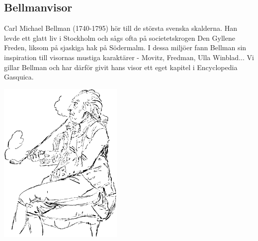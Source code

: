 \begin{flushleft}
\section{Bellmanvisor}
{\Large Carl Michael Bellman (1740-1795) hör till de största svenska skalderna.
Han levde ett glatt liv i Stockholm och sågs ofta på societetskrogen Den Gyllene Freden, liksom på sjaskiga hak på Södermalm.
I dessa miljöer fann Bellman sin inspiration till visornas mustiga karaktärer - Movitz, Fredman, Ulla Winblad...
Vi gillar Bellman och har därför givit hans visor ett eget kapitel i Encyclopedia Gasquica.}
\end{flushleft}

\vspace{2cm}
\begin{center}
\includegraphics[width=6cm]{bilder/bellman.png}
\end{center}
\newpage

\newpage
{} %
\newpage
\renewcommand{\baselinestretch}{.98}
\renewcommand{\baselinestretch}{1.0}
\newpage
{}
\newpage
{}
\newpage
{}
\newpage
{}
